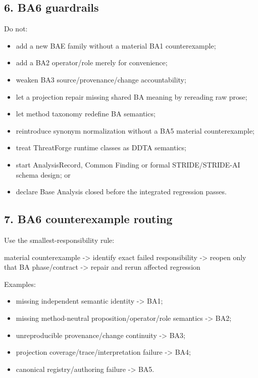 \documentclass[
  10pt,
  a4paper,
]{article}
\newenvironment{Shaded}{}{}
\newcommand{\NormalTok}[1]{#1}
\providecommand{\tightlist}{%
  \setlength{\itemsep}{0pt}\setlength{\parskip}{0pt}}
\begin{document}
\subsection{6. BA6 guardrails}\label{6-ba6-guardrails}

Do not:

\begin{itemize}
\tightlist
\item
  add a new BAE family without a material BA1 counterexample;
\item
  add a BA2 operator/role merely for convenience;
\item
  weaken BA3 source/provenance/change accountability;
\item
  let a projection repair missing shared BA meaning by rereading raw
  prose;
\item
  let method taxonomy redefine BA semantics;
\item
  reintroduce synonym normalization without a BA5 material
  counterexample;
\item
  treat ThreatForge runtime classes as DDTA semantics;
\item
  start AnalysisRecord, Common Finding or formal STRIDE/STRIDE-AI schema
  design; or
\item
  declare Base Analysis closed before the integrated regression passes.
\end{itemize}

\subsection{7. BA6 counterexample
routing}\label{7-ba6-counterexample-routing}

Use the smallest-responsibility rule:

\begin{Shaded}
\begin{Highlighting}[]
\NormalTok{material counterexample}
\NormalTok{    {-}\textgreater{} identify exact failed responsibility}
\NormalTok{    {-}\textgreater{} reopen only that BA phase/contract}
\NormalTok{    {-}\textgreater{} repair and rerun affected regression}
\end{Highlighting}
\end{Shaded}

Examples:

\begin{itemize}
\tightlist
\item
  missing independent semantic identity -\textgreater{} BA1;
\item
  missing method-neutral proposition/operator/role semantics
  -\textgreater{} BA2;
\item
  unreproducible provenance/change continuity -\textgreater{} BA3;
\item
  projection coverage/trace/interpretation failure -\textgreater{} BA4;
\item
  canonical registry/authoring failure -\textgreater{} BA5.
\end{itemize}
\end{document}
